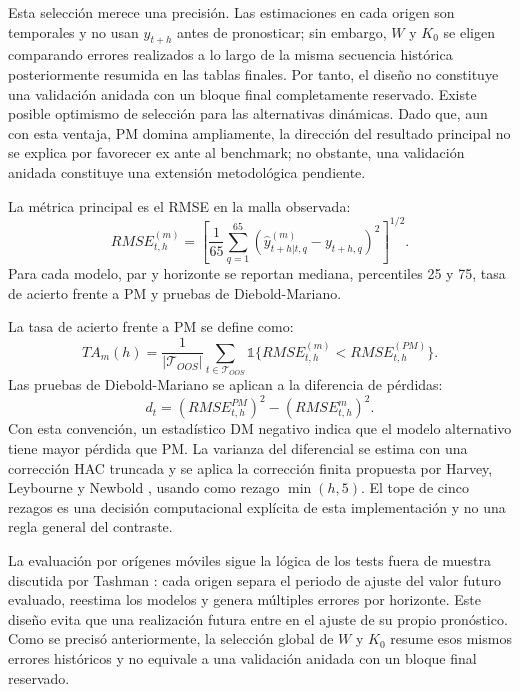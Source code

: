 \documentclass[a4paper,11pt]{article}
\begin{document}
Esta selección merece una precisión. Las estimaciones en cada origen son temporales y no usan \(y_{t+h}\) antes de pronosticar; sin embargo, \(W\) y \(K_0\) se eligen comparando errores realizados a lo largo de la misma secuencia histórica posteriormente resumida en las tablas finales. Por tanto, el diseño no constituye una validación anidada con un bloque final completamente reservado. Existe posible optimismo de selección para las alternativas dinámicas. Dado que, aun con esta ventaja, PM domina ampliamente, la dirección del resultado principal no se explica por favorecer ex ante al benchmark; no obstante, una validación anidada constituye una extensión metodológica pendiente.

La métrica principal es el RMSE en la malla observada:
\[
  RMSE_{t,h}^{(m)}
  =
  \left[
  \frac{1}{65}\sum_{q=1}^{65}
  \left(
  \widehat y_{t+h|t,q}^{(m)}-y_{t+h,q}
  \right)^2
  \right]^{1/2}.
\]
Para cada modelo, par y horizonte se reportan mediana, percentiles 25 y 75, tasa de acierto frente a PM y pruebas de Diebold-Mariano.

La tasa de acierto frente a PM se define como:
\[
  TA_m(h)=
  \frac{1}{|\mathcal{T}_{OOS}|}
  \sum_{t\in\mathcal{T}_{OOS}}
  \mathbb{1}\{RMSE_{t,h}^{(m)}<RMSE_{t,h}^{(PM)}\}.
\]
Las pruebas de Diebold-Mariano se aplican a la diferencia de pérdidas:
\[
  d_t=(RMSE_{t,h}^{PM})^2-(RMSE_{t,h}^{m})^2.
\]
Con esta convención, un estadístico DM negativo indica que el modelo alternativo tiene mayor pérdida que PM. La varianza del diferencial se estima con una corrección HAC truncada y se aplica la corrección finita propuesta por Harvey, Leybourne y Newbold \cite{HarveyLeybourneNewbold1997}, usando como rezago \(\min(h,5)\). El tope de cinco rezagos es una decisión computacional explícita de esta implementación y no una regla general del contraste.

La evaluación por orígenes móviles sigue la lógica de los tests fuera de muestra discutida por Tashman \cite{Tashman2000}: cada origen separa el periodo de ajuste del valor futuro evaluado, reestima los modelos y genera múltiples errores por horizonte. Este diseño evita que una realización futura entre en el ajuste de su propio pronóstico. Como se precisó anteriormente, la selección global de \(W\) y \(K_0\) resume esos mismos errores históricos y no equivale a una validación anidada con un bloque final reservado.
\end{document}
